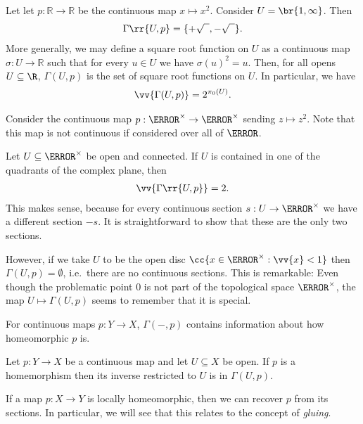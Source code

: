 \documentclass{article}
\begin{document}
\begin{example}
  Let let $p : \mathbb{R} \to \mathbb{R}$ be the continuous map $x \mapsto x^2$.
  Consider $U = \br{1,\infty}$. Then
  \begin{align*}
    \Gamma\rr{U,p} = \{+\sqrt{\phantom{a}}, -\sqrt{\phantom{a}}\}.
  \end{align*}
  More generally, we may define a square root function on $U$ as a continuous map
  $\sigma  : U \to \mathbb{R}$ such that for every  $u \in U$ we have $\sigma(u)^2 = u$.
  Then, for all opens $U\subseteq\R$, $\Gamma(U,p)$ is the set of square root
  functions on $U$. In particular, we have
  \begin{align*}
    \vv{\Gamma(U,p)} = 2^{\pi_0(U)}.
  \end{align*}
\end{example}

\begin{example}
  \label{ex:complexroot}
  Consider the continuous map $p : \C^\times \to \C^\times$ sending
  $z \mapsto z^2$. Note that this map is not continuous if considered over all of
  $\C$.

  Let $U\subseteq\C^\times$ be open and connected. If $U$ is
  contained in one of the quadrants of the complex plane, then
  \begin{align*}
    \vv{\Gamma\rr{U, p}} = 2.
  \end{align*}
  This makes sense, because for every continuous section $s:U\to\C^\times$ we have
  a different section $-s$. It is straightforward to show that these are the only
  two sections.

  However, if we take $U$ to be the open disc $\cc{x \in \C^\times : \vv{x}<1}$
  then $\Gamma(U,p)=\emptyset$, i.e.~there are no continuous sections. This is
  remarkable: Even though the problematic point $0$ is not part of the
  topological space $\C^\times$, the map $U\mapsto\Gamma(U,p)$ seems to
  remember that it is special.
\end{example}

For continuous maps $p : Y \to X$, $\Gamma(-,p)$ contains information
about how homeomorphic $p$ is.

\begin{proposition}
  Let $p : Y \to X$ be a continuous map and let $U\subseteq X$ be open.
  If $p$ is a homemorphism then its inverse restricted to $U$
  is in $\Gamma(U,p)$.
\end{proposition}

\begin{remark}
  If a map $p : X \to Y$ is locally homeomorphic, then we can recover
  $p$ from its sections. In particular, we will see that this relates to the
  concept of \emph{gluing}.
\end{remark}
\end{document}
